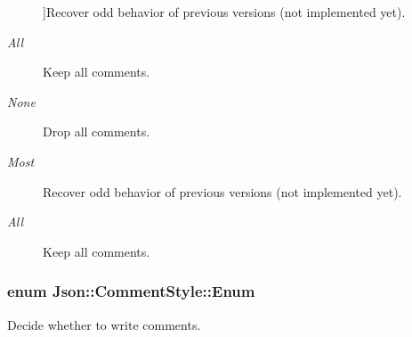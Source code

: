 \begin{Desc}
\begin{description}
{}]Recover odd behavior of previous versions (not implemented yet). \item[{\em 
All\label{struct_json_1_1_comment_style_a51fc08f3518fd81eba12f340d19a3d0ca23cbf2619e7ca2201259b71212089d6b}
}]Keep all comments. \item[{\em 
None\label{struct_json_1_1_comment_style_a51fc08f3518fd81eba12f340d19a3d0ca36399eca8a3b9d995dd8ab0ecb6b5398}
}]Drop all comments. \item[{\em 
Most\label{struct_json_1_1_comment_style_a51fc08f3518fd81eba12f340d19a3d0ca0a9010dbb245e235801402fcc930e3ae}
}]Recover odd behavior of previous versions (not implemented yet). \item[{\em 
All\label{struct_json_1_1_comment_style_a51fc08f3518fd81eba12f340d19a3d0ca23cbf2619e7ca2201259b71212089d6b}
}]Keep all comments. \end{description}
\end{Desc}
\subsubsection[{Enum}]{\setlength{\rightskip}{0pt plus 5cm}enum {\bf Json\+::\+Comment\+Style\+::\+Enum}}\label{struct_json_1_1_comment_style_a51fc08f3518fd81eba12f340d19a3d0c}


Decide whether to write comments. 

